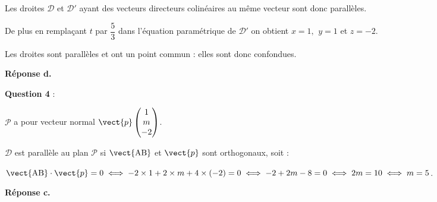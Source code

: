 Les droites $\mathcal{D}$ et $\mathcal{D}'$ ayant des vecteurs directeurs colinéaires au même vecteur sont donc parallèles.

De plus en remplaçant $t$ par $\dfrac{5}{3}$ dans l'équation paramétrique de $\mathcal{D}'$ on obtient $x = 1,~\, y = 1$ et $z = - 2$.

Les droites sont parallèles et ont un point commun : elles sont donc confondues.

\smallskip

\hfill\textbf{Réponse d.}

\medskip

\textbf{Question 4} : 





$\mathcal{P}$ a pour vecteur normal $\vect{p}\begin{pmatrix}1\\m\\-2\end{pmatrix}$.

$\mathcal{D}$ est parallèle au plan $\mathcal{P}$ si $\vect{\text{AB}}$ et $\vect{p}$ sont orthogonaux, soit :

$\vect{\text{AB}} \cdot \vect{p} = 0 \iff -2 \times 1 + 2 \times m + 4 \times (- 2) = 0 \iff - 2 + 2m - 8 = 0 \iff 2m = 10 \iff m = 5$. 

\smallskip

\hfill\textbf{Réponse c.}

\medskip

\bigskip
